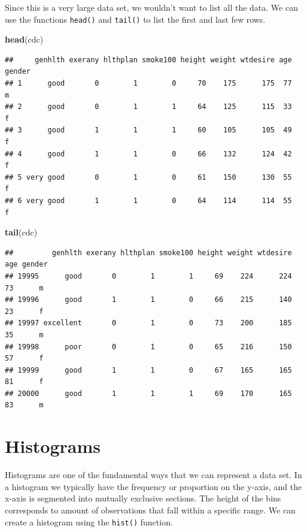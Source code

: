 \documentclass[
]{book}
\newenvironment{Shaded}{\begin{snugshade}}{\end{snugshade}}
\newcommand{\KeywordTok}[1]{\textcolor[rgb]{0.13,0.29,0.53}{\textbf{#1}}}
\newcommand{\NormalTok}[1]{#1}
\begin{document}
Since this is a very large data set, we wouldn't want to list all the data. We can use the functions \texttt{head()} and \texttt{tail()} to list the first and last few rows.

\begin{Shaded}
\begin{Highlighting}[]
\KeywordTok{head}\NormalTok{(cdc)}
\end{Highlighting}
\end{Shaded}

\begin{verbatim}
##     genhlth exerany hlthplan smoke100 height weight wtdesire age gender
## 1      good       0        1        0     70    175      175  77      m
## 2      good       0        1        1     64    125      115  33      f
## 3      good       1        1        1     60    105      105  49      f
## 4      good       1        1        0     66    132      124  42      f
## 5 very good       0        1        0     61    150      130  55      f
## 6 very good       1        1        0     64    114      114  55      f
\end{verbatim}

\begin{Shaded}
\begin{Highlighting}[]
\KeywordTok{tail}\NormalTok{(cdc)}
\end{Highlighting}
\end{Shaded}

\begin{verbatim}
##         genhlth exerany hlthplan smoke100 height weight wtdesire age gender
## 19995      good       0        1        1     69    224      224  73      m
## 19996      good       1        1        0     66    215      140  23      f
## 19997 excellent       0        1        0     73    200      185  35      m
## 19998      poor       0        1        0     65    216      150  57      f
## 19999      good       1        1        0     67    165      165  81      f
## 20000      good       1        1        1     69    170      165  83      m
\end{verbatim}

\hypertarget{histograms}{%
\section{Histograms}\label{histograms}}

Histograms are one of the fundamental ways that we can represent a data set. In a histogram we typically have the frequency or proportion on the y-axis, and the x-axis is segmented into mutually exclusive sections. The height of the bins corresponds to amount of observations that fall within a specific range. We can create a histogram using the \texttt{hist()} function.
\end{document}
